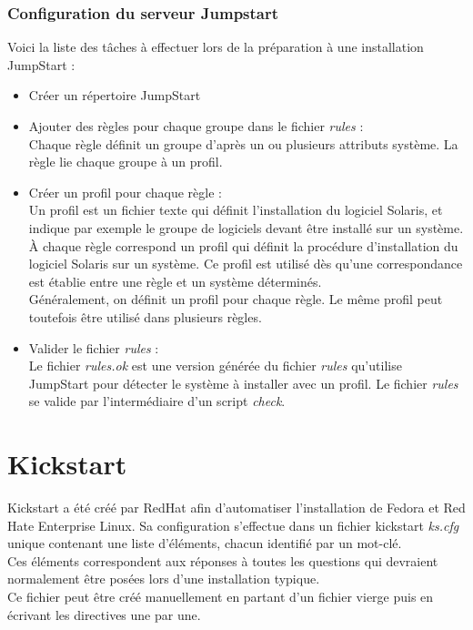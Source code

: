 \documentclass[a4paper,12pt,one side,titlepage]{report}
\begin{document}
\subsubsection{Configuration du serveur Jumpstart}
Voici la liste des tâches à effectuer lors de la préparation à une installation JumpStart :\\
\begin{itemize}
  \item Créer un répertoire JumpStart\\
  \item Ajouter des règles pour chaque groupe dans le fichier \textit{rules} :\\
Chaque règle définit un groupe d'après un ou plusieurs attributs système. La règle lie chaque groupe à un profil.\\
  \item Créer un profil pour chaque règle :\\
Un profil est un fichier texte qui définit l'installation du logiciel Solaris, et indique par exemple le groupe de logiciels devant être installé sur un système. À chaque règle correspond un profil qui définit la procédure d'installation du logiciel Solaris sur un système. Ce profil est utilisé dès qu'une correspondance est établie entre une règle et un système déterminés.\\Généralement, on définit un profil pour chaque règle. Le même profil peut toutefois être utilisé dans plusieurs règles.\\
  \item Valider le fichier \textit{rules} :\\
Le fichier \textit{rules.ok} est une version générée du fichier \textit{rules} qu'utilise JumpStart pour détecter le système à installer avec un profil. Le fichier \textit{rules} se valide par l'intermédiaire d'un script \textit{check}.
\end{itemize}

\section{Kickstart}
Kickstart a été créé par RedHat afin d'automatiser l'installation de Fedora et Red Hate Enterprise Linux. Sa configuration s'effectue dans un fichier kickstart \textit{ks.cfg} unique contenant une liste d'éléments, chacun identifié par un mot-clé.\\Ces éléments correspondent aux réponses à toutes les questions qui devraient normalement être posées lors d'une installation typique.\\
Ce fichier peut être créé manuellement en partant d'un fichier vierge puis en écrivant les directives une par une.\\
\end{document}
